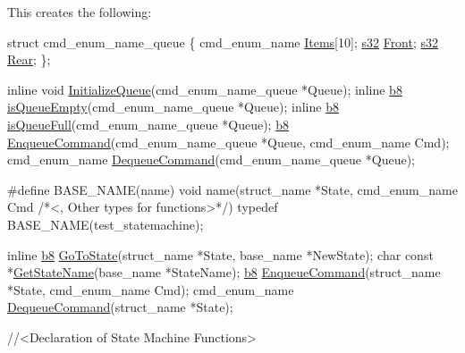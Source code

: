 This creates the following\+: 
\begin{DoxyCode}
\textcolor{keyword}{struct }cmd\_enum\_name\_queue
\{
    cmd\_enum\_name \hyperlink{state__template_8cpp_a8dbb11e631f5fffa9a593e33f5831ed9}{Items}[10];
    \hyperlink{ab__common_8h_ae9b1af5c037e57a98884758875d3a7c4}{s32} \hyperlink{state__template_8cpp_afb0397e8798aa6a6e51e96ef747c57be}{Front};
    \hyperlink{ab__common_8h_ae9b1af5c037e57a98884758875d3a7c4}{s32} \hyperlink{state__template_8cpp_ab334bee7c72436f2d94d87e722656116}{Rear};
\};

\textcolor{keyword}{inline} \textcolor{keywordtype}{void} \hyperlink{Generated__Test_8h_a3ee2f2be736dcd0ff7e75d6ff8d2e6d5}{InitializeQueue}(cmd\_enum\_name\_queue *Queue);
\textcolor{keyword}{inline} \hyperlink{ab__common_8h_a70e369648385b50f2d0588e8e8745275}{b8} \hyperlink{Generated__001_8h_ad2ffc62f6aa5a206f9537ec0862b62b2}{isQueueEmpty}(cmd\_enum\_name\_queue *Queue);
\textcolor{keyword}{inline} \hyperlink{ab__common_8h_a70e369648385b50f2d0588e8e8745275}{b8} \hyperlink{Generated__001_8h_aa950b67af8b11518beb172512da739f6}{isQueueFull}(cmd\_enum\_name\_queue *Queue);
\hyperlink{ab__common_8h_a70e369648385b50f2d0588e8e8745275}{b8} \hyperlink{Generated__001_8h_a3f103e11ae8a34710efceb9f334c7d56}{EnqueueCommand}(cmd\_enum\_name\_queue *Queue, cmd\_enum\_name Cmd);
cmd\_enum\_name \hyperlink{Generated__001_8h_a9d087daa1094d6feb551bca28df70599}{DequeueCommand}(cmd\_enum\_name\_queue *Queue);

\textcolor{preprocessor}{#define BASE\_NAME(name) void name(struct\_name *State, cmd\_enum\_name Cmd }\textcolor{comment}{/*<, Other types for functions>*/}\textcolor{preprocessor}{)}
\textcolor{keyword}{typedef} BASE\_NAME(test\_statemachine);

\textcolor{keyword}{inline} \hyperlink{ab__common_8h_a70e369648385b50f2d0588e8e8745275}{b8} \hyperlink{Generated__001_8h_a1dd64b679141089c38e51c1ef6fd641f}{GoToState}(struct\_name *State, base\_name  *NewState);
\textcolor{keywordtype}{char} \textcolor{keyword}{const} *\hyperlink{Generated__001_8h_a3092a6bb8fdc6a334969301a56010702}{GetStateName}(base\_name *StateName);
\hyperlink{ab__common_8h_a70e369648385b50f2d0588e8e8745275}{b8} \hyperlink{Generated__001_8h_a3f103e11ae8a34710efceb9f334c7d56}{EnqueueCommand}(struct\_name *State, cmd\_enum\_name Cmd);
cmd\_enum\_name \hyperlink{Generated__001_8h_a9d087daa1094d6feb551bca28df70599}{DequeueCommand}(struct\_name *State);

\textcolor{comment}{//<Declaration of State Machine Functions>}
\end{DoxyCode}


